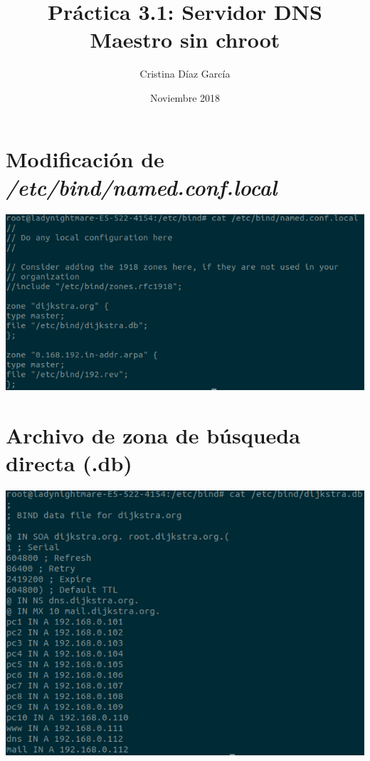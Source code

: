 \documentclass{article}
\title{Práctica 3.1: Servidor DNS Maestro sin chroot}
\author{Cristina Díaz García}
\date{Noviembre 2018}
\begin{document}

\begin{titlingpage}
\maketitle
\end{titlingpage}

\newpage

\tableofcontents

\newpage

\section{Modificación de \textit{/etc/bind/named.conf.local}}

\begin{center}
	\includegraphics[scale=0.5]{PoniendoZonas.png} 
\end{center}

\section{Archivo de zona de búsqueda directa (.db)}

\begin{center}
	\includegraphics[scale=0.5]{db.png} 
\end{center}
\end{document}
